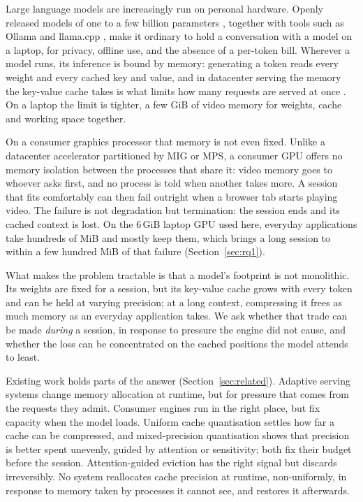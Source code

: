 \documentclass{article}
\begin{document}
Large language models are increasingly run on personal hardware. Openly
released models of one to a few billion parameters \citep{qwen2024report},
together with tools such as Ollama \citep{ollama} and llama.cpp
\citep{llamacpp}, make it ordinary to hold a conversation with a model on a
laptop, for privacy, offline use, and the absence of a per-token bill. Wherever
a model runs, its inference is bound by memory: generating a token reads every
weight and every cached key and value, and in datacenter serving the memory the
key-value cache takes is what limits how many requests are served at once
\citep{kwon2023pagedattention}. On a laptop the limit is tighter, a few GiB of
video memory for weights, cache and working space together.

On a consumer graphics processor that memory is not even fixed. Unlike a
datacenter accelerator partitioned by MIG or MPS, a consumer GPU offers no
memory isolation between the processes that share it: video memory goes to
whoever asks first, and no process is told when another takes more. A session
that fits comfortably can then fail outright when a browser tab starts playing
video. The failure is not degradation but termination: the session ends and its
cached context is lost. On the 6\,GiB laptop GPU used here, everyday
applications take hundreds of MiB and mostly keep them, which brings a long
session to within a few hundred MiB of that failure (Section~\ref{sec:rq1}).

What makes the problem tractable is that a model's footprint is not
monolithic. Its weights are fixed for a session, but its key-value cache grows
with every token and can be held at varying precision; at a long context,
compressing it frees as much memory as an everyday application takes. We ask
whether that trade can be made \textit{during} a session, in response to
pressure the engine did not cause, and whether the loss can be concentrated on
the cached positions the model attends to least.

Existing work holds parts of the answer (Section~\ref{sec:related}). Adaptive
serving systems change memory allocation at runtime, but for pressure that
comes from the requests they admit. Consumer engines run in the right place,
but fix capacity when the model loads. Uniform cache quantisation settles how
far a cache can be compressed, and mixed-precision quantisation shows that
precision is better spent unevenly, guided by attention or sensitivity; both
fix their budget before the session. Attention-guided eviction has the right
signal but discards irreversibly. No system reallocates cache precision at
runtime, non-uniformly, in response to memory taken by processes it cannot see,
and restores it afterwards.
\end{document}
